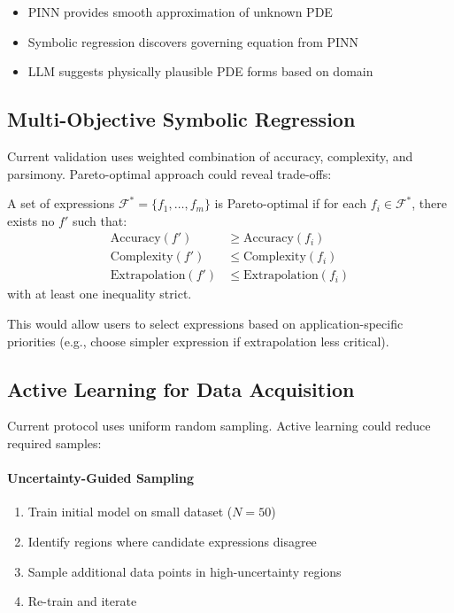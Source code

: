 \begin{itemize}
    \item PINN provides smooth approximation of unknown PDE
    \item Symbolic regression discovers governing equation from PINN
    \item LLM suggests physically plausible PDE forms based on domain
\end{itemize}

\subsection{Multi-Objective Symbolic Regression}

Current validation uses weighted combination of accuracy, complexity, and parsimony. Pareto-optimal approach could reveal trade-offs:

\begin{definition}
A set of expressions $\mathcal{F}^* = \{f_1, \ldots, f_m\}$ is Pareto-optimal if for each $f_i \in \mathcal{F}^*$, there exists no $f'$ such that:
\begin{align}
\text{Accuracy}(f') &\geq \text{Accuracy}(f_i) \\
\text{Complexity}(f') &\leq \text{Complexity}(f_i) \\
\text{Extrapolation}(f') &\leq \text{Extrapolation}(f_i)
\end{align}
with at least one inequality strict.
\end{definition}

This would allow users to select expressions based on application-specific priorities (e.g., choose simpler expression if extrapolation less critical).

\subsection{Active Learning for Data Acquisition}

Current protocol uses uniform random sampling. Active learning could reduce required samples:

\paragraph{Uncertainty-Guided Sampling}
\begin{enumerate}
    \item Train initial model on small dataset ($N = 50$)
    \item Identify regions where candidate expressions disagree
    \item Sample additional data points in high-uncertainty regions
    \item Re-train and iterate
\end{enumerate}

